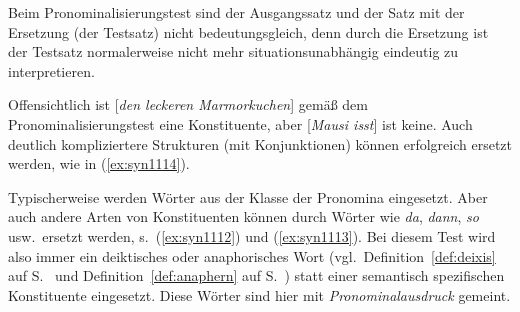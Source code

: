 

Beim Pronominalisierungstest sind der Ausgangssatz und der Satz mit der Ersetzung (der Testsatz) nicht bedeutungsgleich, denn durch die Ersetzung ist der Testsatz normalerweise nicht mehr situationsunabhängig eindeutig zu interpretieren.

\begin{exe}
  \ex\label{ex:syn1111}
  \begin{xlist}
  \end{xlist}
\end{exe}

Offensichtlich ist [\textit{den leckeren Marmorkuchen}] gemäß dem Pronominalisierungstest eine Konstituente, aber [\textit{Mausi isst}] ist keine.
Auch deutlich kompliziertere Strukturen (\zB mit Konjunktionen) können erfolgreich ersetzt werden, wie in (\ref{ex:syn1114}).

\begin{exe}
\end{exe}

Typischerweise werden Wörter aus der Klasse der Pronomina eingesetzt.
Aber auch andere Arten von Konstituenten können durch Wörter wie \textit{da}, \textit{dann}, \textit{so} usw.\ ersetzt werden, s.\ (\ref{ex:syn1112}) und (\ref{ex:syn1113}).
Bei diesem Test wird also immer ein deiktisches oder anaphorisches Wort (vgl.\ Definition~\ref{def:deixis} auf S.~\pageref{def:deixis} und Definition~\ref{def:anaphern} auf S.~\pageref{def:anaphern}) statt einer semantisch spezifischen Konstituente eingesetzt.
Diese Wörter sind hier mit \textit{Pronominalausdruck} gemeint.

\begin{exe}
\end{exe}

